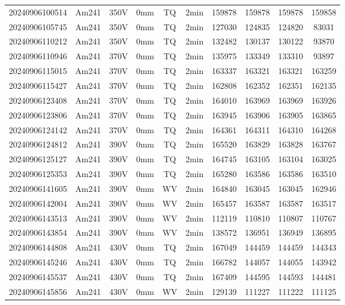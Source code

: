 \begin{center}
{\begin{longtable}{c c c c c c c c c c}
    20240906100514 & Am241 & 350V & 0mm & TQ & 2min & 159878 & 159878 & 159878 & 159858 \\
    20240906105745 & Am241 & 350V & 0mm & TQ & 2min & 127030 & 124835 & 124820 & 83031 \\
    20240906110212 & Am241 & 350V & 0mm & TQ & 2min & 132482 & 130137 & 130122 & 93870 \\
    20240906110946 & Am241 & 370V & 0mm & TQ & 2min & 135975 & 133349 & 133310 & 93897 \\
    20240906115015 & Am241 & 370V & 0mm & TQ & 2min & 163337 & 163321 & 163321 & 163259 \\
    20240906115427 & Am241 & 370V & 0mm & TQ & 2min & 162808 & 162352 & 162351 & 162135 \\
    20240906123408 & Am241 & 370V & 0mm & TQ & 2min & 164010 & 163969 & 163969 & 163926 \\
    20240906123806 & Am241 & 370V & 0mm & TQ & 2min & 163945 & 163906 & 163905 & 163865 \\
    20240906124142 & Am241 & 370V & 0mm & TQ & 2min & 164361 & 164311 & 164310 & 164268 \\
    20240906124812 & Am241 & 390V & 0mm & TQ & 2min & 165520 & 163829 & 163828 & 163767 \\
    20240906125127 & Am241 & 390V & 0mm & TQ & 2min & 164745 & 163105 & 163104 & 163025 \\
    20240906125353 & Am241 & 390V & 0mm & TQ & 2min & 165280 & 163586 & 163586 & 163510 \\
    20240906141605 & Am241 & 390V & 0mm & WV & 2min & 164840 & 163045 & 163045 & 162946 \\
    20240906142004 & Am241 & 390V & 0mm & WV & 2min & 165457 & 163587 & 163587 & 163517 \\
    20240906143513 & Am241 & 390V & 0mm & WV & 2min & 112119 & 110810 & 110807 & 110767 \\
    20240906143854 & Am241 & 390V & 0mm & WV & 2min & 138572 & 136951 & 136949 & 136895 \\
    20240906144808 & Am241 & 430V & 0mm & TQ & 2min & 167049 & 144459 & 144459 & 144343 \\
    20240906145246 & Am241 & 430V & 0mm & TQ & 2min & 166782 & 144057 & 144055 & 143942 \\
    20240906145537 & Am241 & 430V & 0mm & TQ & 2min & 167409 & 144595 & 144593 & 144481 \\
    20240906145856 & Am241 & 430V & 0mm & WV & 2min & 129139 & 111227 & 111222 & 111125 \\

\end{longtable}}
\end{center}
